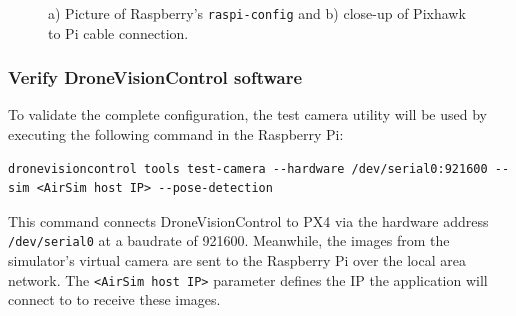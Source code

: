 \begin{figure}
  \centering
  \caption{a) Picture of Raspberry's \texttt{raspi-config} and b) close-up of Pixhawk to Pi cable connection.}
  \label{fig:serial-connection}
\end{figure}


\subsubsection{Verify DroneVisionControl software}

To validate the complete configuration, the test camera utility will be used by executing the following command in the Raspberry Pi:

\begin{verbatim}
dronevisioncontrol tools test-camera --hardware /dev/serial0:921600 --sim <AirSim host IP> --pose-detection
\end{verbatim}

This command connects DroneVisionControl to PX4 via the hardware address \texttt{/dev/serial0} at a baudrate of 921600. Meanwhile, the images from the simulator's virtual camera are sent to the Raspberry Pi over the local area network. The \texttt{<AirSim host IP>} parameter defines the IP the application will connect to to receive these images.

